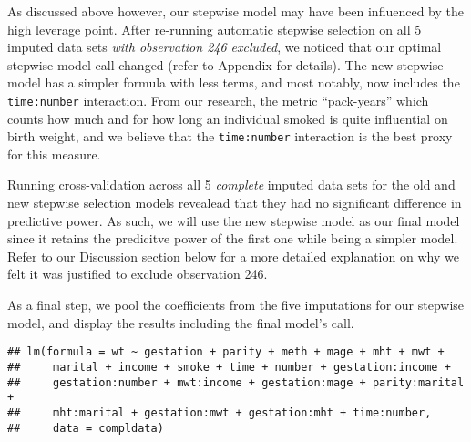 \documentclass[]{article}
\begin{document}
As discussed above however, our stepwise model may have been influenced
by the high leverage point. After re-running automatic stepwise
selection on all 5 imputed data sets \emph{with observation 246
excluded}, we noticed that our optimal stepwise model call changed
(refer to Appendix for details). The new stepwise model has a simpler
formula with less terms, and most notably, now includes the
\texttt{time:number} interaction. From our research, the metric
``pack-years'' which counts how much and for how long an individual
smoked is quite influential on birth weight, and we believe that the
\texttt{time:number} interaction is the best proxy for this measure.

Running cross-validation across all 5 \emph{complete} imputed data sets
for the old and new stepwise selection models revealead that they had no
significant difference in predictive power. As such, we will use the new
stepwise model as our final model since it retains the predicitve power
of the first one while being a simpler model. Refer to our Discussion
section below for a more detailed explanation on why we felt it was
justified to exclude observation 246.

As a final step, we pool the coefficients from the five imputations for
our stepwise model, and display the results including the final model's
call.

\begin{verbatim}
## lm(formula = wt ~ gestation + parity + meth + mage + mht + mwt + 
##     marital + income + smoke + time + number + gestation:income + 
##     gestation:number + mwt:income + gestation:mage + parity:marital + 
##     mht:marital + gestation:mwt + gestation:mht + time:number, 
##     data = compldata)
\end{verbatim}
\end{document}
